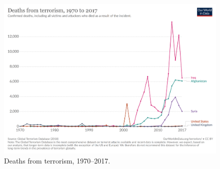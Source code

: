 \documentclass[conference]{IEEEtran}
\begin{document}
\begin{figure}
\includegraphics[scale=0.15]{figures/fatalities-from-terrorism}
    \caption{Deaths from terrorism, 1970--2017.}
    \label{fig:appendix_terrorism_deaths}
\end{figure}\label{subsec:data-verification-after-some-pre-processing-methods}
\end{document}
